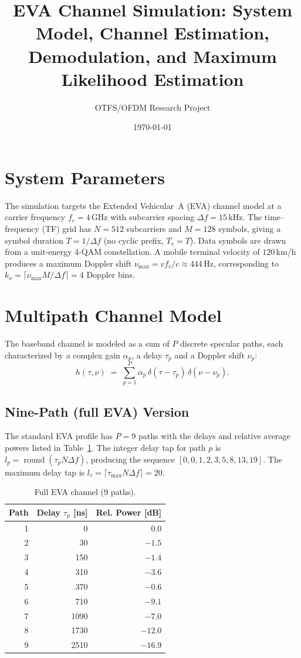 \documentclass[11pt,a4paper]{article}
\title{EVA Channel Simulation: System Model, Channel Estimation,\\
Demodulation, and Maximum Likelihood Estimation}
\author{OTFS/OFDM Research Project}
\date{\today}
\newcommand{\deltaf}{\Delta f}
\begin{document}
\maketitle

\section{System Parameters}

The simulation targets the Extended Vehicular~A (EVA) channel model at a
carrier frequency $f_c = 4$\,GHz with subcarrier spacing $\deltaf = 15$\,kHz.
The time--frequency (TF) grid has $N = 512$ subcarriers and $M = 128$ symbols,
giving a symbol duration $T = 1/\deltaf$ (no cyclic prefix, $T_s = T$). Data
symbols are drawn from a unit-energy 4-QAM constellation. A mobile
terminal velocity of $120$\,km/h produces a maximum Doppler shift
$\nu_{\max} = v f_c / c \approx 444$\,Hz, corresponding to $k_\nu =
\lceil \nu_{\max} M / \deltaf \rceil = 4$ Doppler bins.

\section{Multipath Channel Model}

The baseband channel is modeled as a sum of $P$ discrete specular paths,
each characterized by a complex gain $\alpha_p$, a delay $\tau_p$ and a
Doppler shift $\nu_p$:
\begin{equation}
  h(\tau,\nu) \;=\; \sum_{p=1}^{P} \alpha_p\,
  \delta(\tau - \tau_p)\,\delta(\nu - \nu_p).
\end{equation}

\subsection{Nine-Path (full EVA) Version}

The standard EVA profile has $P = 9$ paths with the delays and relative
average powers listed in Table~\ref{tab:eva9}. The integer delay tap for
path $p$ is $l_p = \operatorname{round}(\tau_p N \deltaf)$, producing the
sequence $[0,0,1,2,3,5,8,13,19]$. The maximum delay tap is
$l_\tau = \lceil \tau_{\max} N \deltaf \rceil = 20$.

\begin{table}[h]
\centering
\caption{Full EVA channel (9 paths).}
\label{tab:eva9}
\begin{tabular}{rrr}
\toprule
Path & Delay $\tau_p$ [ns] & Rel. Power [dB] \\
\midrule
1 & 0    &  0.0 \\
2 & 30   & $-1.5$ \\
3 & 150  & $-1.4$ \\
4 & 310  & $-3.6$ \\
5 & 370  & $-0.6$ \\
6 & 710  & $-9.1$ \\
7 & 1090 & $-7.0$ \\
8 & 1730 & $-12.0$ \\
9 & 2510 & $-16.9$ \\
\bottomrule
\end{tabular}
\end{table}
\end{document}
